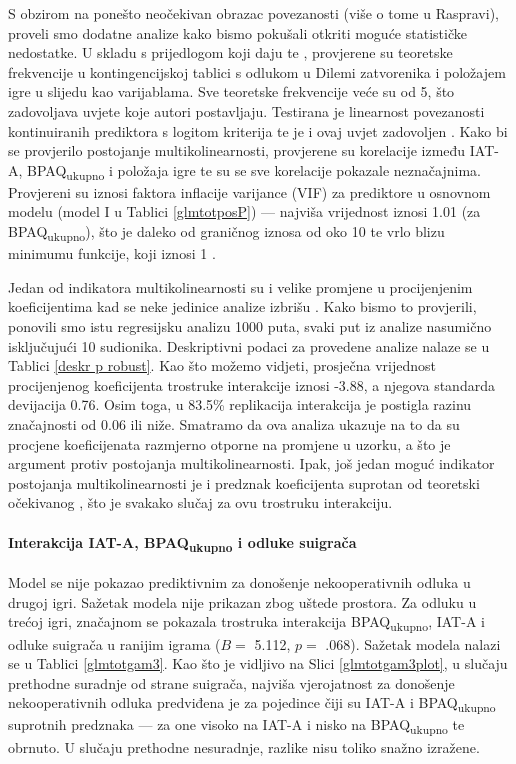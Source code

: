 \documentclass[a4paper, 12pt]{report}
\begin{document}
S obzirom na ponešto neočekivan obrazac povezanosti (više o tome u Raspravi),
proveli smo dodatne analize kako bismo pokušali otkriti moguće
statističke nedostatke. U skladu s prijedlogom koji daju \citet{fieldr} te
\citet{tabachnick2012multi}, provjerene su
teoretske frekvencije u kontingencijskoj tablici s odlukom u Dilemi zatvorenika i 
položajem igre u slijedu kao varijablama. Sve teoretske frekvencije veće su od
5, što zadovoljava uvjete koje autori postavljaju.
Testirana je linearnost povezanosti kontinuiranih prediktora s logitom
kriterija te je i ovaj uvjet zadovoljen \citep{fieldr, jaccard2001interaction}.
Kako bi se provjerilo postojanje multikolinearnosti, provjerene su korelacije
između IAT-A, BPAQ\textsubscript{ukupno} i položaja igre te su se sve korelacije
pokazale neznačajnima. Provjereni su iznosi faktora inflacije varijance (VIF) za
prediktore u osnovnom modelu (model I u Tablici \ref{glmtotposP}) --- 
najviša vrijednost iznosi 1.01 (za
BPAQ\textsubscript{ukupno}), što je daleko od graničnog iznosa od oko 10 te
vrlo blizu minimumu funkcije, koji iznosi 1
\citep{james2013introduction, fieldr, salkind2007encyclopedia}. 

Jedan od indikatora multikolinearnosti su i velike  promjene u procijenjenim
koeficijentima kad se neke jedinice analize izbrišu
\citep{salkind2007encyclopedia}. Kako bismo to provjerili, ponovili smo istu
regresijsku analizu 1000 puta, svaki put iz analize nasumično isključujući 10
sudionika. Deskriptivni podaci za provedene analize nalaze se u Tablici
\ref{deskr p robust}. Kao što možemo vidjeti, prosječna vrijednost procijenjenog
koeficijenta trostruke interakcije iznosi -3.88, a njegova standarda devijacija
0.76. Osim toga, u 83.5\% replikacija interakcija je postigla razinu
značajnosti od 0.06 ili niže. Smatramo da ova analiza ukazuje na to da su
procjene koeficijenata razmjerno otporne na promjene u uzorku, a što je argument
protiv postojanja multikolinearnosti.
Ipak, još jedan moguć
indikator postojanja multikolinearnosti je i predznak koeficijenta suprotan od teoretski
očekivanog \citep{salkind2007encyclopedia}, što je svakako slučaj za ovu trostruku interakciju.

\paragraph{Interakcija IAT-A, BPAQ\textsubscript{ukupno} i odluke suigrača} 
Model se nije pokazao prediktivnim za donošenje nekooperativnih odluka u drugoj
igri. Sažetak modela nije prikazan zbog uštede prostora. 
Za odluku u trećoj igri, značajnom se pokazala trostruka interakcija
BPAQ\textsubscript{ukupno}, IAT-A i odluke suigrača u ranijim igrama ($B =$
5.112, $p =$ .068). Sažetak modela nalazi se u Tablici \ref{glmtotgam3}. Kao
što je vidljivo na Slici \ref{glmtotgam3plot}, u slučaju prethodne suradnje od
strane suigrača, najviša vjerojatnost za donošenje nekooperativnih odluka
predviđena je za pojedince čiji su IAT-A i BPAQ\textsubscript{ukupno} suprotnih
predznaka --- za one visoko na IAT-A i nisko na BPAQ\textsubscript{ukupno} te
obrnuto. U slučaju prethodne nesuradnje, razlike nisu toliko snažno izražene.
\end{document}
